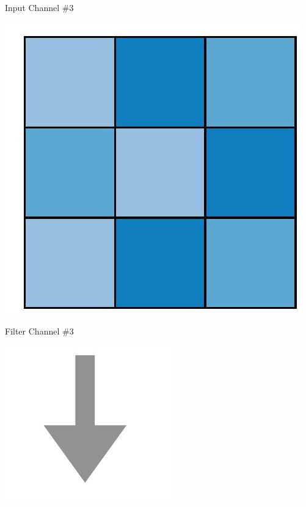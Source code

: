 \documentclass[10pt]{article}
\begin{document}
Input Channel \#3

\begin{center}
\includegraphics[max width=\textwidth]{2024_01_08_959e2db67a31f073f6d2g-07}
\end{center}

Filter Channel \#3

\begin{center}
\includegraphics[max width=\textwidth]{2024_01_08_959e2db67a31f073f6d2g-07(2)}
\end{center}
\end{document}
